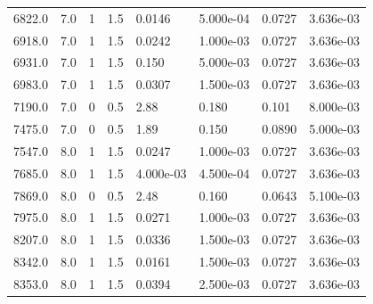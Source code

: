 \documentclass[preview]{standalone}
\begin{document}
{{{\begin{tabular}{L{1.2cm}C{1.2cm} C{0.3cm}C{0.5cm} C{1.4cm}C{1.4cm} C{1.4cm}C{1.4cm}}
  6822.0  &   7.0  & 1     & 1.5 &  0.0146  & 5.000e-04  & 0.0727 &  3.636e-03   \\ 
  6918.0  &   7.0  & 1     & 1.5 &  0.0242  & 1.000e-03  & 0.0727 &  3.636e-03   \\ 
  6931.0  &   7.0  & 1     & 1.5 &  0.150  & 5.000e-03  & 0.0727 &  3.636e-03   \\ 
  6983.0  &   7.0  & 1     & 1.5 &  0.0307  & 1.500e-03  & 0.0727 &  3.636e-03   \\ 
  7190.0  &   7.0  & 0     & 0.5 &  2.88  & 0.180  & 0.101 &  8.000e-03   \\ 
  7475.0  &   7.0  & 0     & 0.5 &  1.89  & 0.150  & 0.0890 &  5.000e-03   \\ 
  7547.0  &   8.0  & 1     & 1.5 &  0.0247  & 1.000e-03  & 0.0727 &  3.636e-03   \\ 
  7685.0  &   8.0  & 1     & 1.5 &  4.000e-03  & 4.500e-04  & 0.0727 &  3.636e-03   \\ 
  7869.0  &   8.0  & 0     & 0.5 &  2.48  & 0.160  & 0.0643 &  5.100e-03   \\ 
  7975.0  &   8.0  & 1     & 1.5 &  0.0271  & 1.000e-03  & 0.0727 &  3.636e-03   \\ 
  8207.0  &   8.0  & 1     & 1.5 &  0.0336  & 1.500e-03  & 0.0727 &  3.636e-03   \\ 
  8342.0  &   8.0  & 1     & 1.5 &  0.0161  & 1.500e-03  & 0.0727 &  3.636e-03   \\ 
  8353.0  &   8.0  & 1     & 1.5 &  0.0394  & 2.500e-03  & 0.0727 &  3.636e-03   \\ 
\hline 
\end{tabular} 

}}}
\end{document}
